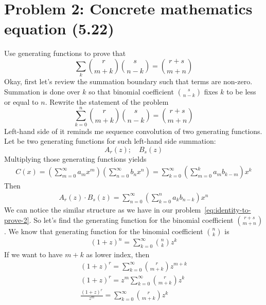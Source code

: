 ﻿\section{Problem 2: Concrete mathematics equation (5.22)}
\label{sec:problem-2:-concrete-mathematics-equation-(5.22)}
Use generating functions to prove that
\begin{equation}
    \sum_{k} \binom{r}{m+k} \binom{s}{n-k} = \binom{r+s}{m+n}
    \label{eq:identity-to-prove}
\end{equation}
Okay, first let's review the summation boundary such that terms are non-zero.
Summation is done over $k$ so that binomial coefficient $\binom{s}{n-k}$ fixes $k$ to be less or equal to $n$.
Rewrite the statement of the problem
\begin{equation}
    \sum_{k=0}^{n} \binom{r}{m+k} \binom{s}{n-k} = \binom{r+s}{m+n}
    \label{eq:identity-to-prove-2}
\end{equation}
Left-hand side of it reminds me sequence convolution of two generating functions.
Let be two generating functions for such left-hand side summation:
\begin{equation*}
    A_r(z); \quad B_s(z)
\end{equation*}
Multiplying those generating functions yields
\begin{align*}
    C(x) = \left(\sum_{m=0}^{\infty} a_m x^m\right) \left(\sum_{n=0}^{\infty} b_n x^n\right) = \sum_{k=0}^{\infty} \left( \sum_{m=0}^{k} a_m b_{k-m} \right) x^k
\end{align*}
Then
\begin{align*}
    A_r(z) \cdot B_s(z) = \sum_{n=0}^{\infty} \left( \sum_{k=0}^{n} a_k b_{n-k} \right) x^n
\end{align*}
We can notice the similar structure as we have in our problem~\eqref{eq:identity-to-prove-2}.
So let's find the generating function for the binomial coefficient $\binom{r+s}{m+n}$.
We know that generating function for the binomial coefficient $\binom{n}{k}$ is
\begin{align*}
(1+z)
    ^{n} = \sum_{k=0}^{\infty} \binom{n}{k} z^k
\end{align*}
If we want to have $m+k$ as lower index, then
\begin{align*}
(1+z)
    ^{r} = \sum_{k=0}^{\infty} \binom{r}{m+k} z^{m+k} \\
    (1+z)^{r} = z^m \sum_{k=0}^{\infty} \binom{r}{m+k} z^{k} \\
    \frac{(1+z)^{r}}{z^m} = \sum_{k=0}^{\infty} \binom{r}{m+k} z^{k}
\end{align*}
